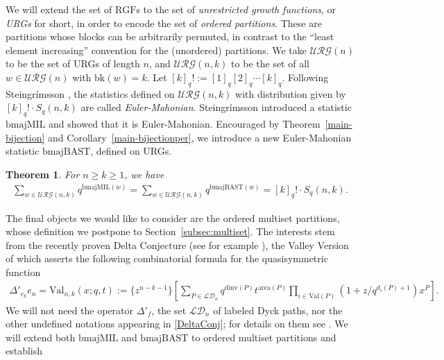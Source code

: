 \documentclass[12pt]{amsart}
\numberwithin{equation}{section}
\theoremstyle{plain}
\newtheorem{theorem}{Theorem}[section]
\theoremstyle{definition}
\def\bk{\mathrm{bk}}
\def\RGF{\mathrm{RGF}}
\def\bmajMIL{\mathrm{bmajMIL}}
\def\bmajBAST{\mathrm{bmajBAST}}
\def\dinv{\mathrm{dinv}}
\def\area{\mathrm{area}}
\def\Val{\mathrm{Val}}
\def\URG{\mathcal{URG}}
\def\LD{\mathcal{LD}}
\begin{document}
We will extend the set of $\RGF$s to the set of \emph{unrestricted growth functions}, or \emph{URGs} for short, in order to encode the set of \emph{ordered partitions}. These are partitions whose blocks can be arbitrarily permuted, in contrast to the ``least element increasing'' convention for the (unordered) partitions. We take $\URG(n)$ to be the set of URGs of length $n$, and $\URG(n,k)$ to be the set of all $w\in\URG(n)$ with $\bk(w)=k$. Let $[k]_q!:=[1]_q[2]_q\cdots [k]_q$.
Following Steingr\'imsson \cite{Ste}, the statistics defined on $\URG(n,k)$ with distribution given by $[k]_q!\cdot S_q(n,k)$ are called \emph{Euler-Mahonian}.
Steingr\'imsson introduced a statistic $\bmajMIL$ and showed that it is Euler-Mahonian. Encouraged by Theorem~\ref{main-bijection} and Corollary~\ref{main-bijectionper}, we introduce a new Euler-Mahonian statistic $\bmajBAST$, defined on URGs.

\begin{theorem}\label{main-URG}
For $n\ge k\ge 1$, we have
\begin{align*}
\sum_{w\in\URG(n,k)}q^{\bmajMIL(w)}=\sum_{w\in\URG(n,k)}q^{\bmajBAST(w)}=[k]_q!\cdot S_q(n,k).
\end{align*}
\end{theorem}

The final objects we would like to consider are the ordered multiset partitions, whose definition we postpone to Section~\ref{subsec:multiset}. The interests stem from the recently proven Delta Conjecture (see for example \cite{HRW,Rh,HRS,BCH}), the Valley Version of which asserts the following combinatorial formula for the quasisymmetric function
\begin{align}\label{DeltaConj}
\Delta'_{e_k}e_n=\Val_{n,k}(x;q,t):=\{z^{n-k-1}\}\left[\sum_{P\in\LD_n}q^{\dinv(P)}t^{\area(P)}\prod_{i\in\Val(P)}(1+z/q^{d_i(P)+1})x^P\right].
\end{align}
We will not need the operator $\Delta'_f$, the set $\LD_n$ of labeled Dyck paths, nor the other undefined notations appearing in \eqref{DeltaConj}; for details on them see \cite{HRW}. We will extend both $\bmajMIL$ and $\bmajBAST$ to ordered multiset partitions and establish
\end{document}
